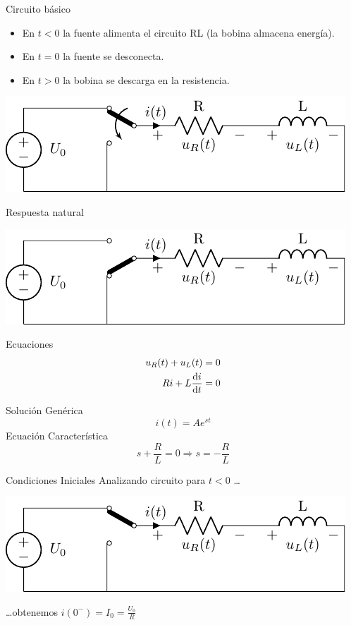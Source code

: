 \documentclass[aspectratio=169, usenames,svgnames,dvipsnames]{beamer}
\begin{document}
\begin{frame}[label={sec:orgb2f41e2}]{Circuito básico}
\begin{itemize}
\item En \(t < 0\) la fuente alimenta el circuito RL (la bobina almacena energía).
\item En \(t = 0\) la fuente se desconecta.
\item En \(t > 0\) la bobina se descarga en la resistencia.
\end{itemize}
\begin{center}
\includegraphics[width=.9\linewidth]{figs/transitorio_circuitoRL.pdf}
\end{center}
\end{frame}

\begin{frame}[label={sec:orge2cd24f}]{Respuesta natural}
\begin{center}
\includegraphics[height=0.25\textheight]{figs/transitorio_circuitoRL_t0+.pdf}
\end{center}
Ecuaciones
\begin{align*}
  u_R(t) + u_L(t) &= 0\\
  R i + L\diff{i}{t} &= 0
\end{align*}

Solución Genérica
\[
  i(t) = A e^{st}
\]
Ecuación Característica
\[
  s + \frac{R}{L} = 0 \Rightarrow s = -\frac{R}{L}
\]
\end{frame}

\begin{frame}[label={sec:org7567c72}]{Condiciones Iniciales}
Analizando circuito para \(t < 0\) \ldots{} 
\begin{center}
\includegraphics[width=.9\linewidth]{figs/transitorio_circuitoRL_t0-.pdf}
\end{center}
\ldots{}obtenemos  \(i(0^-) = I_0 = \frac{U_0}{R}\) 
\end{frame}
\end{document}
